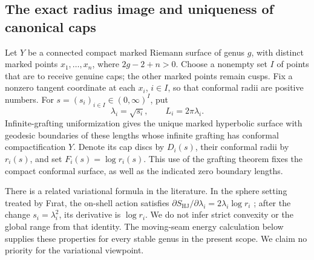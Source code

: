 \subsection{The exact radius image and uniqueness of canonical caps}
\label{sec:A2b-secondary}

Let $Y$ be a connected compact marked Riemann surface of genus $g$, with
distinct marked points $x_1,\ldots,x_n$, where $2g-2+n>0$.
Choose a nonempty set $I$ of points that are to receive genuine caps;
the other marked points remain cusps. Fix a nonzero tangent coordinate
at each $x_i$, $i\in I$, so that conformal radii are positive numbers.
For $s=(s_i)_{i\in I}\in(0,\infty)^I$, put
\[
 \lambda_i=\sqrt{s_i},\qquad L_i=2\pi\lambda_i.
\]
Infinite-grafting uniformization gives the unique marked hyperbolic surface
with geodesic boundaries of these lengths whose infinite grafting has
conformal compactification $Y$. Denote its cap discs by $D_i(s)$, their
conformal radii by $r_i(s)$, and set $F_i(s)=\log r_i(s)$.
This use of the grafting theorem fixes the compact conformal surface,
as well as the indicated zero boundary lengths.

There is a related variational formula in the literature. In the sphere
setting treated by F\i rat, the on-shell action satisfies
$\partial S_{\mathrm{HJ}}/\partial\lambda_i=2\lambda_i\log r_i$
\cite[Appendix B, equation (B.1)]{AFirat2023}; after the change
$s_i=\lambda_i^2$, its derivative is $\log r_i$. We do not infer strict
convexity or the global range from that identity. The moving-seam energy
calculation below supplies these properties for every stable genus in
the present scope. We claim no priority for the variational viewpoint.

